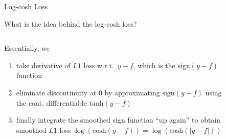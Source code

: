 \documentclass[11pt,compress,t,notes=noshow, xcolor=table]{beamer}
\begin{document}
\begin{vbframe}{Log-cosh Loss}
\framebreak

What is the idea behind the log-cosh loss?
\vspace{-0.3cm}
\begin{columns}

\begin{column}{0.4\textwidth}

{\scriptsize
Essentially, we  
\begin{enumerate}\setlength{\itemsep}{0.32em}
    \item take derivative of $L1$ loss w.r.t.~$y-f$, which is the $\text{sign}(y-f)$ function
    \item eliminate discontinuity at $0$ by approximating $\text{sign}(y-f)$ using the cont. differentiable $\text{tanh}(y-f)$
    \item finally integrate the smoothed sign function ``up again'' to obtain smoothed $L1$ loss $\log(\text{cosh}(y-f))=\log(\text{cosh}(|y-f|))$
\end{enumerate}
}
\end{column}

\begin{column}{0.7\textwidth}

\begin{figure}
      \centering
    \end{figure}

\end{column}


\end{columns}
\end{vbframe}
\end{document}
